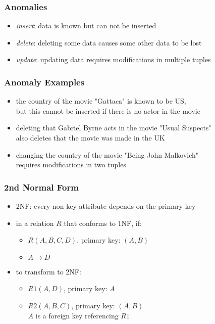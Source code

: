 \documentclass[dvipsnames]{beamer}
\begin{document}
\begin{frame}
  \frametitle{Anomalies}

  \begin{itemize}
    \item \emph{insert}: data is known but can not be inserted

    \medskip
    \item \emph{delete}: deleting some data causes some other data to be lost

    \medskip
    \item \emph{update}: updating data requires modifications in multiple tuples
  \end{itemize}
\end{frame}

\begin{frame}
  \frametitle{Anomaly Examples}

  \hyperlink{example_r}{}

  \begin{itemize}
    \item the country of the movie "Gattaca" is known to be US,\\
      but this cannot be inserted if there is no actor in the movie

    \pause
    \medskip
    \item deleting that Gabriel Byrne acts in the movie "Usual Suspects"\\
      also deletes that the movie was made in the UK

    \pause
    \medskip
    \item changing the country of the movie "Being John Malkovich"\\
      requires modifications in two tuples
  \end{itemize}
\end{frame}

\begin{frame}
  \frametitle{2nd Normal Form}

  \begin{itemize}
    \item \alert{2NF}: every non-key attribute depends on the primary key

    \pause
    \medskip
    \item in a relation $R$ that conforms to 1NF, if:
    \begin{itemize}
      \item $R(A,B,C,D)$, primary key: $(A,B)$
      \item $A \rightarrow D$
    \end{itemize}

    \medskip
    \item to transform to 2NF:
    \begin{itemize}
      \item $R1(A,D)$, primary key: $A$
      \item $R2(A,B,C)$, primary key: $(A,B)$\\
        $A$ is a foreign key referencing $R1$
    \end{itemize}
  \end{itemize}
\end{frame}
\end{document}
